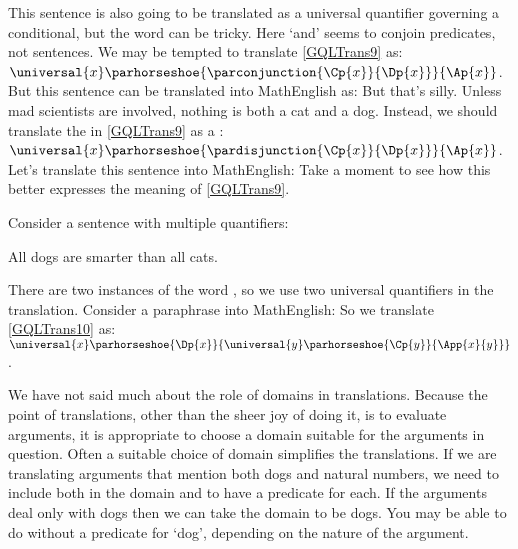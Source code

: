 \noindent{}This sentence is also going to be translated as a universal quantifier governing a conditional, but the word  can be tricky.  Here `and' seems to conjoin predicates, not sentences.  We may be tempted to translate \ref{GQLTrans9} as: $\universal{\variable{x}}\parhorseshoe{\parconjunction{\Cp{\variable{x}}}{\Dp{\variable{x}}}}{\Ap{\variable{x}}}$.  But this \GQL{} sentence can be translated into MathEnglish as:   But that's silly.  Unless mad scientists are involved, nothing is both a cat and a dog.  Instead, we should translate the  in \ref{GQLTrans9} as a \mention{$\VEE$}:  $\universal{\variable{x}}\parhorseshoe{\pardisjunction{\Cp{\variable{x}}}{\Dp{\variable{x}}}}{\Ap{\variable{x}}}$.  Let's translate this \GQL{} sentence into MathEnglish:   Take a moment to see how this better expresses the meaning of \ref{GQLTrans9}.

Consider a sentence with multiple quantifiers:

\begin{menumerate}
	\item\label{GQLTrans10} All dogs are smarter than all cats.
\end{menumerate}

\noindent{}There are two instances of the word , so we use two universal quantifiers in the translation.
Consider a paraphrase into MathEnglish: 
So we translate \ref{GQLTrans10} as: $\universal{\variable{x}}\parhorseshoe{\Dp{\variable{x}}}{\universal{\variable{y}}\parhorseshoe{\Cp{\variable{y}}}{\App{\variable{x}}{\variable{y}}}}$.

We have not said much about the role of domains in translations.
Because the point of translations, other than the sheer joy of doing it, is to evaluate arguments, it is appropriate to choose a domain suitable for the arguments in question.
Often a suitable choice of domain simplifies the translations.
If we are translating arguments that mention both dogs and natural numbers, we need to include both in the domain and to have a predicate for each.
If the arguments deal only with dogs then we can take the domain to be dogs.
You may be able to do without a predicate for `dog', depending on the nature of the argument.

